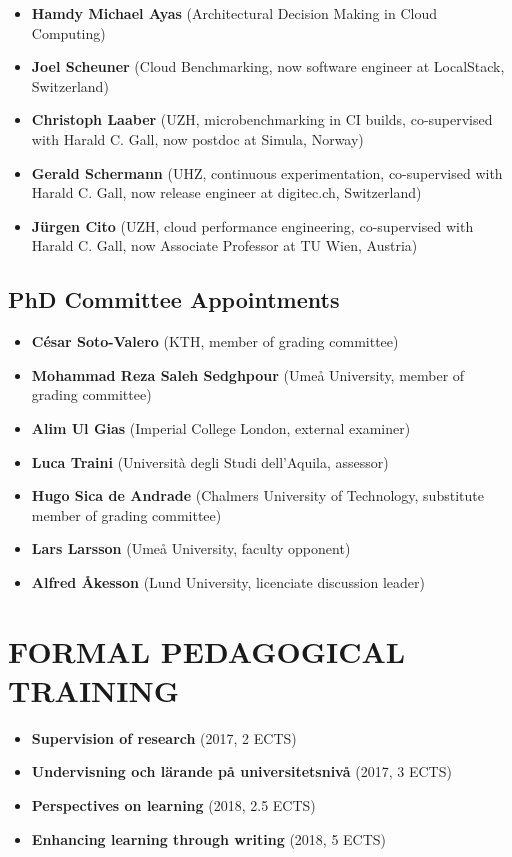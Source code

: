 \documentclass[paper=letter,fontsize=11pt]{scrartcl} %
\newcommand{\NewPart}[2]{\section*{\uppercase{#1} #2}}
\begin{document}
\begin{itemize}
\item \textbf{Hamdy Michael Ayas}  (Architectural Decision Making in Cloud Computing)
\item \textbf{Joel Scheuner}  (Cloud Benchmarking, now software engineer at LocalStack, Switzerland)
\item \textbf{Christoph Laaber} (UZH, microbenchmarking in CI builds, co-supervised with Harald C. Gall, now postdoc at Simula, Norway)
\item \textbf{Gerald Schermann} (UHZ, continuous experimentation, co-supervised with Harald C. Gall, now release engineer at digitec.ch, Switzerland)
\item \textbf{J\"urgen Cito} (UZH, cloud performance engineering, co-supervised with Harald C. Gall, now Associate Professor at TU Wien, Austria)
\end{itemize}

\subsection*{PhD Committee Appointments}

\begin{itemize}
\item \textbf{César Soto-Valero} (KTH, member of grading committee)
\item \textbf{Mohammad Reza Saleh Sedghpour} (Umeå University, member of grading committee)
\item \textbf{Alim Ul Gias} (Imperial College London, external examiner) 
\item \textbf{Luca Traini} (Università degli Studi dell'Aquila, assessor) 
\item \textbf{Hugo Sica de Andrade} (Chalmers University of Technology, substitute member of grading committee) 
\item \textbf{Lars Larsson} (Umeå University, faculty opponent)
\item \textbf{Alfred Åkesson} (Lund University, licenciate discussion leader)
\end{itemize}

\NewPart{Formal Pedagogical Training}{}

\begin{itemize}
\item \textbf{Supervision of research} (2017, 2 ECTS)
\item \textbf{Undervisning och lärande på universitetsnivå}  (2017, 3 ECTS)
\item \textbf{Perspectives on learning}  (2018, 2.5 ECTS)
\item \textbf{Enhancing learning through writing} (2018, 5 ECTS)
\end{itemize}
\end{document}
